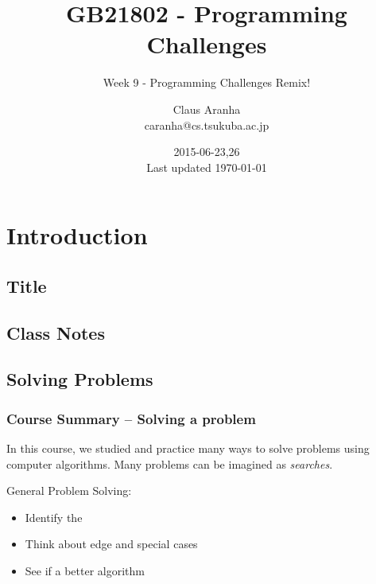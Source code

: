 \documentclass{beamer}
\title[GB21802]{GB21802 - Programming Challenges}
\subtitle[]{Week 9 - Programming Challenges Remix!}
\author[Claus Aranha]{Claus Aranha\\{\footnotesize caranha@cs.tsukuba.ac.jp}}
\institute{College of Information Science}
\date{2015-06-23,26\\{\tiny Last updated \today}}
\begin{document}
\section{Introduction}
\subsection{Title}
\begin{frame}
\maketitle
\end{frame}

\subsection{Class Notes}



\subsection{Solving Problems}
\begin{frame}
  \frametitle{Course Summary -- Solving a problem}

  {\smaller
    \begin{block}{}
      In this course, we studied and practice many ways
      to solve problems using computer algorithms. Many
      problems can be imagined as \emph{searches}.
    \end{block}

    \vfill
    
    General Problem Solving:
    \begin{itemize}
    \item Identify the 
    \item Think about edge and special cases
    \item See if a better algorithm 
    \end{itemize}
    
  }
  
\end{frame}
\end{document}
